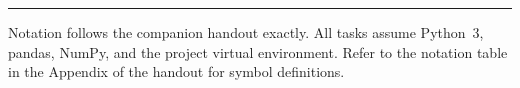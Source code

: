 \documentclass[11pt,a4paper]{article}
\theoremstyle{definition}
\newcommand{\1}[1]{\mathbf{1}\!\left[#1\right]}
\begin{document}
\bigskip
\noindent\rule{\linewidth}{0.8pt}
\begin{center}
{\small\color{warmgrey}
  Notation follows the companion handout exactly.
  All tasks assume Python~3, pandas, NumPy, and the project virtual environment.
  Refer to the notation table in the Appendix of the handout for symbol
  definitions.}
\end{center}
\end{document}

